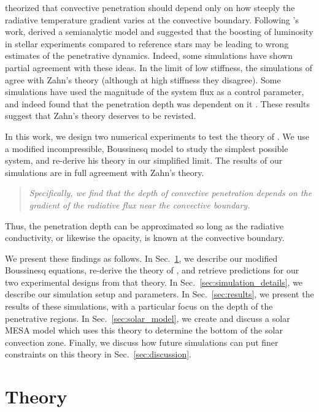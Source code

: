 \documentclass{aastex631}
\begin{document}
\citet{zahn1991} theorized that convective penetration should depend only on how steeply the radiative temperature gradient varies at the convective boundary.
Following \citet{zahn1991}'s work, \citet{rempel2004} derived a semianalytic model and suggested that the boosting of luminosity in stellar experiments compared to reference stars may be leading to wrong estimates of the penetrative dynamics.
Indeed, some simulations have shown partial agreement with these ideas.
In the limit of low stiffness, the simulations of \citet{hurlburt_etal_1994, rogers_etal_2006} agree with Zahn's theory (although at high stiffness they disagree).
Some simulations have used the magnitude of the system flux as a control parameter, and indeed found that the penetration depth was dependent on it \citep{singh_etal_1998, hotta2017, kapyla2019}.
These results suggest that Zahn's theory deserves to be revisted.

In this work, we design two numerical experiments to test the theory of \citet{zahn1991}.
We use a modified incompressible, Boussinesq model to study the simplest possible system, and re-derive his theory in our simplified limit.
The results of our simulations are in full agreement with Zahn's theory.
\begin{quote}
\emph{
Specifically, we find that the depth of convective penetration depends on the gradient of the radiative flux near the convective boundary.
}
\end{quote}
Thus, the penetration depth can be approximated so long as the radiative conductivity, or likewise the opacity, is known at the convective boundary.

We present these findings as follows.
In Sec.~\ref{sec:theory}, we describe our modified Boussinesq equations, re-derive the theory of \citet{zahn1991}, and retrieve predictions for our two experimental designs from that theory.
In Sec.~\ref{sec:simulation_details}, we describe our simulation setup and parameters.
In Sec.~\ref{sec:results}, we present the results of these simulations, with a particular focus on the depth of the penetrative regions.
In Sec.~\ref{sec:solar_model}, we create and discuss a solar MESA model which uses this theory to determine the bottom of the solar convection zone.
Finally, we discuss how future simulations can put finer constraints on this theory in Sec.~\ref{sec:discussion}.

\section{Theory}
\label{sec:theory}
\end{document}
